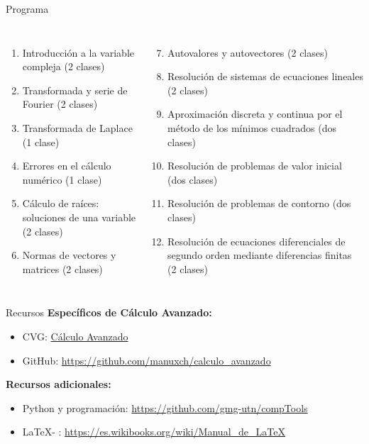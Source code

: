 \documentclass[9pt, aspectratio=169]{beamer}
\begin{document}
\begin{frame}{Programa}
	\begin{columns}[t]
		\cx
		\begin{enumerate}
			\item Introducción a la variable compleja (2 clases)
			\item Transformada y serie de Fourier (2 clases)
			\item Transformada de Laplace (1 clase)
			\item Errores en el cálculo numérico (1 clase)
			\item Cálculo de raíces: soluciones de una variable (2 clases)
			\item Normas de vectores y matrices (2 clases)
		\end{enumerate}
		\cx
		\begin{enumerate}
			\setcounter{enumi}{6}
			\item Autovalores y autovectores (2 clases)
			\item Resolución de sistemas de ecuaciones lineales (2 clases)
			\item Aproximación discreta y continua por el método de los mínimos cuadrados (dos clases)
			\item Resolución de problemas de valor inicial (dos clases)
			\item Resolución de problemas de contorno (dos clases)
			\item Resolución de ecuaciones diferenciales de segundo orden mediante diferencias finitas (2 clases)
		\end{enumerate}
	\end{columns}
	\vspace{1em}
	\begin{columns}[c]
		\cx
		\centering

		\cx
		\centering
	\end{columns}
\end{frame}

\begin{frame}{Recursos}
	\textbf{Específicos de Cálculo Avanzado:}
	\begin{itemize}
		\item CVG: \href{https://frlp.cvg.utn.edu.ar/course/view.php?id=189}{Cálculo Avanzado}
		\item GitHub: \url{https://github.com/manuxch/calculo_avanzado}
	\end{itemize}

	\textbf{Recursos adicionales:}
	\begin{itemize}
		\item Python y programación: \url{https://github.com/gmg-utn/compTools}
		\item \LaTeX - \XeLaTeX: \url{https://es.wikibooks.org/wiki/Manual_de_LaTeX}
	\end{itemize}
\end{frame}
\end{document}
